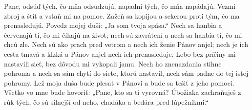 Pane, odsúď tých, čo mňa odsudzujú,
napadni tých, čo mňa napádajú.
\versseparator
Vezmi zbroj a štít
a vstaň mi na pomoc.
\versseparator
Zažeň sa kopijou a sekerou
proti tým, čo ma prenasledujú.
Povedz mojej duši: „Ja som tvoja spása.“
\versseparator
Nech sa hanbia a červenajú tí,
čo mi číhajú na život;
\versseparator
nech sú zavrátení a nech sa hanbia tí,
čo mi chcú zle.
\versseparator
Nech sú ako prach pred vetrom
a nech ich ženie Pánov anjel;
\versseparator
nech je ich cesta tmavá a klzká
a Pánov anjel nech ich prenasleduje.
\versseparator
Lebo bez príčiny mi nastavili sieť,
bez dôvodu mi vykopali jamu.
\versseparator
Nech ho znenazdania stihne pohroma
a nech sa sám chytí do siete, ktorú nastavil,
nech sám padne do tej istej pohromy.
\versseparator
Lež moja duša bude plesať v Pánovi
a bude sa tešiť z jeho pomoci.
\versseparator
Všetko vo mne bude hovoriť:
„Pane, kto sa ti vyrovná?
\versseparator
Úbožiaka zachraňuješ z rúk tých, čo sú silnejší od neho,
chudáka a bedára pred lúpežníkmi.“
